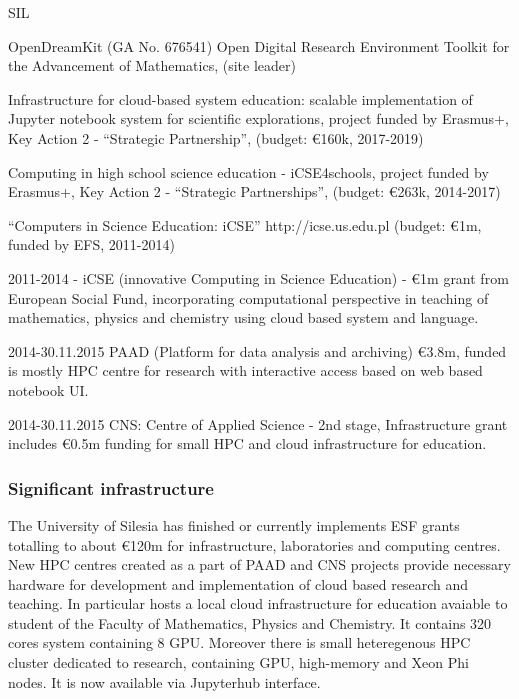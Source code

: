 \begin{sitedescription}{SIL}
\begin{compactenum}
\item OpenDreamKit (GA No. 676541) Open Digital Research Environment
  Toolkit for the Advancement of Mathematics, (site leader)
  \item Infrastructure for cloud-based system education: scalable 
  implementation of Jupyter notebook system for scientific explorations, project funded by Erasmus+, Key Action 2 - ``Strategic Partnership'', (budget: \euro{160}k, 2017-2019)
  \item Computing in high school science education - iCSE4schools,
    project funded by Erasmus+, Key Action 2 - ``Strategic Partnerships'',
    (budget: \euro{263}k, 2014-2017)
  \item ``Computers in Science Education: iCSE'' http://icse.us.edu.pl
    (budget: \euro{1}m, funded by EFS, 2011-2014)
  \item 2011-2014 - iCSE (innovative Computing in Science Education) -
      \euro 1m grant from European Social Fund, incorporating
      computational perspective in teaching of mathematics, physics and
      chemistry using cloud based \Sage system and \Python language.
    \item 2014-30.11.2015 PAAD (Platform for data analysis and archiving) 
    \euro 3.8m, funded is mostly HPC centre for research with
      interactive access based on web based notebook UI.
    \item 2014-30.11.2015 CNS: Centre of Applied Science - 2nd stage,
      Infrastructure grant includes \euro 0.5m funding for small HPC and
      cloud infrastructure for education. 

\end{compactenum}

\subsubsection*{Significant infrastructure}

The University of Silesia has finished or currently implements ESF grants
totalling to about \euro 120m for infrastructure, laboratories and
computing centres. New HPC centres created as a part of PAAD and
CNS projects provide necessary hardware for development
and implementation of cloud based research and teaching. In particular 
 hosts a local cloud infrastructure for education avaiable to student of the Faculty of Mathematics, Physics and Chemistry. It contains 320 cores system containing 8 GPU. Moreover there is small heteregenous HPC cluster dedicated to research, containing GPU, high-memory and Xeon Phi nodes. It is now available via Jupyterhub interface. 


\end{sitedescription}
